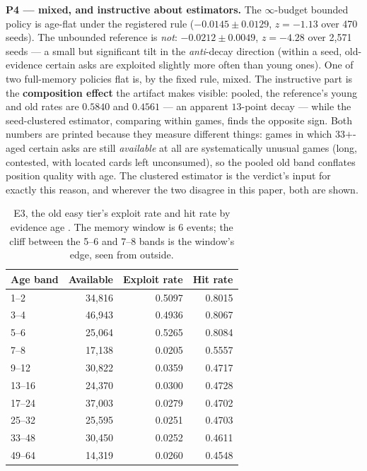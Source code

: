 \documentclass[11pt]{article}
\begin{document}
\textbf{P4 --- mixed, and instructive about estimators.} The $\infty$-budget bounded
policy is age-flat under the registered rule ($-0.0145 \pm 0.0129$, $z = -1.13$ over 470
seeds). The unbounded reference is \emph{not}: $-0.0212 \pm 0.0049$, $z = -4.28$ over
2{,}571 seeds --- a small but
significant tilt in the \emph{anti}-decay direction (within a seed, old-evidence
certain asks are exploited slightly more often than young ones). One of two
full-memory policies flat is, by the fixed rule, mixed. The instructive part is the
\textbf{composition effect} the artifact makes visible: pooled, the reference's young
and old rates are $0.5840$ and $0.4561$ --- an apparent $13$-point decay --- while the
seed-clustered estimator, comparing within games, finds the opposite sign. Both
numbers are printed because they measure different things: games in which 33$+$-aged
certain asks are still \emph{available} at all are systematically unusual games (long,
contested, with located cards left unconsumed), so the pooled old band conflates
position quality with age. The clustered estimator is the verdict's input for exactly
this reason, and wherever the two disagree in this paper, both are shown.

\begin{table}[t]
\centering
\caption{E3, the old easy tier's exploit rate and hit rate by evidence age
\cite{artifact}. The memory window is 6 events; the cliff between the 5--6 and 7--8
bands is the window's edge, seen from outside.}
\label{tab:cliff}
\footnotesize
\begin{tabular}{@{}lrrr@{}}
\toprule
Age band & Available & Exploit rate & Hit rate \\
\midrule
1--2    & 34{,}816 & 0.5097 & 0.8015 \\
3--4    & 46{,}943 & 0.4936 & 0.8067 \\
5--6    & 25{,}064 & 0.5265 & 0.8084 \\
7--8    & 17{,}138 & 0.0205 & 0.5557 \\
9--12   & 30{,}822 & 0.0359 & 0.4717 \\
13--16  & 24{,}370 & 0.0300 & 0.4728 \\
17--24  & 37{,}003 & 0.0279 & 0.4702 \\
25--32  & 25{,}595 & 0.0251 & 0.4703 \\
33--48  & 30{,}450 & 0.0252 & 0.4611 \\
49--64  & 14{,}319 & 0.0260 & 0.4548 \\
\bottomrule
\end{tabular}
\end{table}
\end{document}
